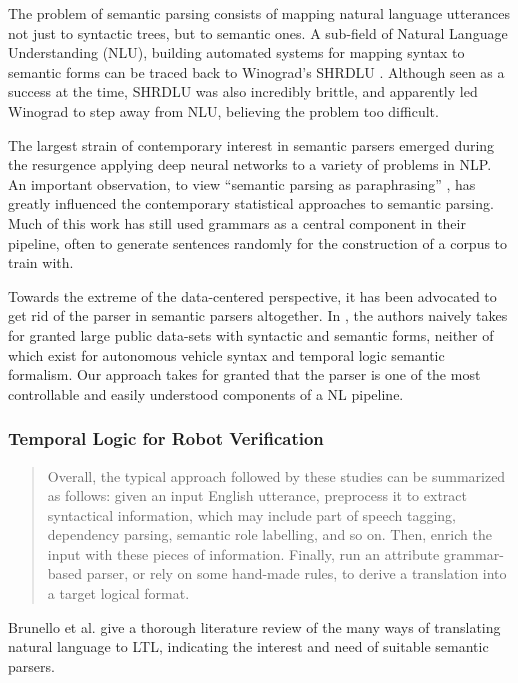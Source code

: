 \documentclass[a4paper, 11pt]{article}
\begin{document}
The problem of semantic parsing consists of mapping natural language utterances
not just to syntactic trees, but to semantic ones. A sub-field of Natural
Language Understanding (NLU), building automated systems for mapping syntax to
semantic forms can be traced back to Winograd's SHRDLU
\cite{winograd1971procedures}. Although seen as a success at the time, SHRDLU
was also incredibly brittle, and apparently led Winograd to step away from NLU,
believing the problem too difficult.

The largest strain of contemporary interest in semantic parsers emerged during
the resurgence applying deep neural networks to a variety of problems in NLP.
An important observation, to view ``semantic parsing as paraphrasing''
\cite{berant-liang-2014-semantic}, has greatly influenced the contemporary
statistical approaches to semantic parsing. Much of this work has still used
grammars as a central component in their  pipeline, often to generate sentences
randomly for the construction of a corpus to train with.

Towards the extreme of the data-centered perspective, it has been advocated to
get rid of the parser in semantic parsers altogether. In \cite{dontParse}, the
authors naively takes for granted large public data-sets with syntactic and
semantic forms, neither of which exist for autonomous vehicle syntax and
temporal logic semantic formalism. Our approach takes for granted that the
parser is one of the most controllable and easily understood components of a NL
pipeline.

\subsubsection{Temporal Logic for Robot Verification}

\begin{quote}
Overall, the typical approach followed by these studies can be summarized as follows:
given an input English utterance, preprocess it to extract syntactical information, which may
include part of speech tagging, dependency parsing, semantic role labelling, and so on. Then,
enrich the input with these pieces of information. Finally, run an attribute grammar-based
parser, or rely on some hand-made rules, to derive a translation into a target logical format.
\cite{brunello_et_al}
\end{quote}

Brunello et al. give a thorough literature review of the many ways of
translating natural language to LTL, indicating the interest and need of
suitable semantic parsers.
\end{document}
